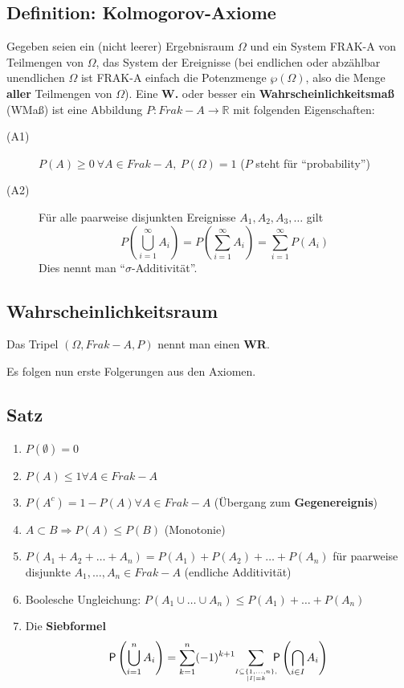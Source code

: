 \subsection{Definition: Kolmogorov-Axiome}

Gegeben seien ein (nicht leerer) Ergebnisraum $\Omega$ und ein System FRAK-A von Teilmengen von $\Omega$, das System der Ereignisse (bei endlichen oder abzählbar unendlichen $\Omega$ ist FRAK-A einfach die Potenzmenge $\wp(\Omega)$, also die Menge \textbf{aller} Teilmengen von $\Omega$).
Eine \textbf{W.} oder besser ein \textbf{Wahrscheinlichkeitsmaß} (WMaß) ist eine Abbildung $P:Frak-A \rightarrow \mathbb{R}$ mit folgenden Eigenschaften:
\begin{description}
 \item[(A1)] $P(A)\geq 0\ \forall A \in Frak-A,\ P(\Omega)=1$ ($P$ steht für ``probability'')
 \item[(A2)] Für alle paarweise disjunkten Ereignisse $A_1,A_2,A_3,\ldots$ gilt
 \begin{displaymath}
	P(\bigcup_{i=1}^\infty A_i) = P(\sum_{i=1}^\infty A_i) = \sum_{i=1}^\infty P(A_i)
 \end{displaymath}
 Dies nennt man ``$\sigma$-Additivität''.
\end{description}

\subsection{Wahrscheinlichkeitsraum}
Das Tripel $(\Omega,Frak-A,P)$ nennt man einen \textbf{WR}.

Es folgen nun erste Folgerungen aus den Axiomen.

\subsection{Satz}
\begin{enumerate}
	\item $P(\emptyset) = 0$
	\item $P(A) \leq 1 \forall A \in Frak-A$
	\item $P(A^c) = 1 - P(A) \forall A \in Frak-A$ (Übergang zum \textbf{Gegenereignis})
	\item $A \subset B \Rightarrow P(A) \leq P(B)$ (Monotonie)
	\item $P(A_1 + A_2 + \ldots + A_n) = P(A_1) + P(A_2) + \ldots + P(A_n)$ für paarweise disjunkte $A_1,\ldots,A_n \in Frak-A$ (endliche Additivität)
	\item Boolesche Ungleichung: $P(A_1 \cup \ldots \cup A_n) \leq P(A_1) + \ldots + P(A_n)$
	\item Die \textbf{Siebformel}
	\[
		\mathsf{P}\left(\bigcup_{i=1}^nA_i\right) = \sum_{k=1}^n(-1)^{k+1}\!\!\sum_{I\subseteq\{1,\dots,n\},\atop |I|=k}\!\!\!\!\mathsf{P}\left(\bigcap_{i\in I}A_i\right)
	\]
\end{enumerate}

